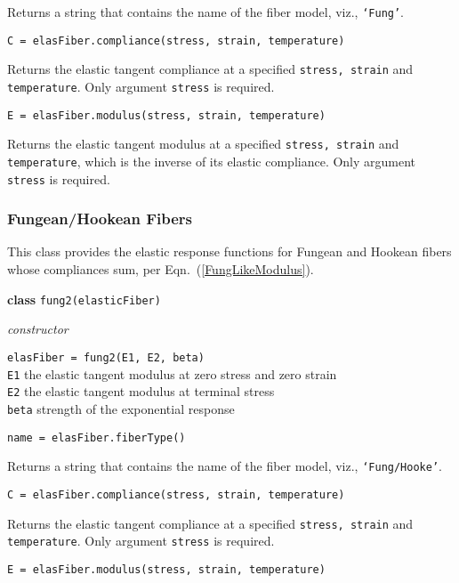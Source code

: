 \medskip\noindent
Returns a string that contains the name of the fiber model, viz., \texttt{`Fung'}.

\medskip\noindent
\texttt{C = elasFiber.compliance(stress, strain, temperature)}

\medskip\noindent
Returns the elastic tangent compliance at a specified \texttt{stress, strain} and \texttt{temperature}.  Only argument \texttt{stress} is required.

\medskip\noindent
\texttt{E = elasFiber.modulus(stress, strain, temperature)}

\medskip\noindent
Returns the elastic tangent modulus at a specified \texttt{stress, strain} and \texttt{temperature}, which is the inverse of its elastic compliance.  Only argument \texttt{stress} is required.


\subsubsection{Fungean\slash Hookean Fibers}

This class provides the elastic response functions for Fungean and Hookean fibers whose compliances sum, per Eqn.~(\ref{FungLikeModulus}).

\bigskip\noindent
\textbf{class} \texttt{fung2(elasticFiber)}

\medskip\noindent
\textit{constructor}

\medskip\noindent
\texttt{elasFiber = fung2(E1, E2, beta)} \\
\indent \texttt{E1} \quad\: the elastic tangent modulus at zero stress and zero strain \\
\indent \texttt{E2} \quad\: the elastic tangent modulus at terminal stress \\
\indent \texttt{beta} \: strength of the exponential response

\newpage
\bigskip\noindent
\texttt{name = elasFiber.fiberType()}

\medskip\noindent
Returns a string that contains the name of the fiber model, viz., \texttt{`Fung/Hooke'}.

\medskip\noindent
\texttt{C = elasFiber.compliance(stress, strain, temperature)}

\medskip\noindent
Returns the elastic tangent compliance at a specified \texttt{stress, strain} and \texttt{temperature}.  Only argument \texttt{stress} is required.

\medskip\noindent
\texttt{E = elasFiber.modulus(stress, strain, temperature)}

